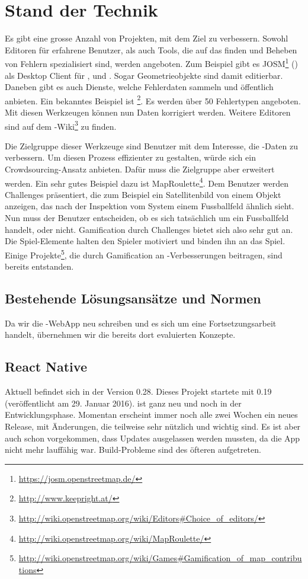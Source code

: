 \chapter{Stand der Technik}
\label{tb-stand-der-technik}
Es gibt eine grosse Anzahl von Projekten, mit dem Ziel  zu verbessern.
Sowohl Editoren für erfahrene Benutzer, als auch Tools, die auf das finden und Beheben von Fehlern spezialisiert sind, werden angeboten.
Zum Beispiel gibt es JOSM\footnote{\url{https://josm.openstreetmap.de/}} () als Desktop Client für ,  und .
Sogar Geometrieobjekte sind damit editierbar.
Daneben gibt es auch Dienste, welche Fehlerdaten sammeln und öffentlich anbieten.
Ein bekanntes Beispiel ist \footnote{\url{http://www.keepright.at/}}.
Es werden über 50 Fehlertypen angeboten.
Mit diesen Werkzeugen können nun Daten korrigiert werden.
Weitere Editoren sind auf dem -Wiki\footnote{\url{http://wiki.openstreetmap.org/wiki/Editors\#Choice_of_editors/}} zu finden.

Die Zielgruppe dieser Werkzeuge sind Benutzer mit dem Interesse, die -Daten zu verbessern.
Um diesen Prozess effizienter zu gestalten, würde sich ein \gls{Crowdsourcing}-Ansatz anbieten.
Dafür muss die Zielgruppe aber erweitert werden.
Ein sehr gutes Beispiel dazu ist MapRoulette\footnote{\url{http://wiki.openstreetmap.org/wiki/MapRoulette/}}.
Dem Benutzer werden Challenges präsentiert, die zum Beispiel ein Satellitenbild von einem Objekt anzeigen, das nach der Inspektion vom System einem Fussballfeld ähnlich sieht.
Nun muss der Benutzer entscheiden, ob es sich tatsächlich um ein Fussballfeld handelt, oder nicht.
\gls{Gamification} durch Challenges bietet sich also sehr gut an.
Die Spiel-Elemente halten den Spieler motiviert und binden ihn an das Spiel.
Einige Projekte\footnote{\url{http://wiki.openstreetmap.org/wiki/Games\#Gamification_of_map_contributions}}, die durch \gls{Gamification} an -Verbesserungen beitragen, sind bereits entstanden.\cite{ba-kort-2012}

\section{Bestehende Lösungsansätze und Normen}
Da wir die \kort{}-\gls{WebApp} neu schreiben und es sich um eine Fortsetzungsarbeit handelt, übernehmen wir die bereits dort evaluierten Konzepte.


\section{React Native}
Aktuell befindet sich  in der Version 0.28.
Dieses Projekt startete mit  0.19 (veröffentlicht am 29. Januar 2016).
 ist ganz neu und noch in der Entwicklungsphase.
Momentan erscheint immer noch alle zwei Wochen ein neues Release, mit Änderungen, die teilweise sehr nützlich und wichtig sind.
Es ist aber auch schon vorgekommen, dass Updates ausgelassen werden mussten, da die App nicht mehr lauffähig war.
Build-Probleme sind des öfteren aufgetreten.

